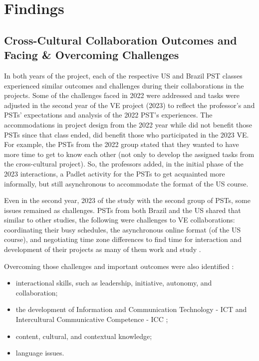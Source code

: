 \section{Findings}\label{sec-findings}
\subsection{Cross-Cultural Collaboration Outcomes and Facing \&	Overcoming Challenges}\label{sub-sec-crosscultural}
	
In both years of the project, each of the respective US and Brazil PST
classes experienced similar outcomes and challenges during their
collaborations in the projects. 
Some of the challenges faced in 2022 were addressed and tasks
were adjusted in the second year of the VE project (2023) to reflect the
professor’s and PSTs’ expectations and analysis of the 2022 PST's experiences. The accommodations in project design from the 2022 year while did not benefit those PSTs since that
class ended, did benefit those who participated in the 2023 VE. For
example, the PSTs from the 2022 group stated that they wanted to have
more time to get to know each other (not only to develop the assigned
tasks from the cross-cultural project). So, the professors added, in the
initial phase of the 2023 interactions, a Padlet activity for the PSTs
to get acquainted more informally, but still asynchronous to accommodate
the format of the US course.

Even in the second year, 2023 of the study with the second group of
PSTs, some issues remained as challenges. PSTs from both Brazil and the
US shared that similar to other studies, the following were challenges
to VE collaborations: coordinating their busy schedules, the
asynchronous online format (of the US course), and negotiating time zone
differences to find time for interaction and development of their
projects as many of them work and study \cite{fuchs2017multiple,evaluate2019evaluating,kern_learning_2018}.

Overcoming those challenges and important outcomes were also identified
:

\begin{itemize}
\item	interactional skills, such as leadership, initiative, autonomy, and collaboration;
\item	the development of Information and Communication Technology - ICT \cite{calvo2023investigating} and Intercultural Communicative Competence - ICC \cite{idris2019intercultural,lopez2017developing};
\item	content, cultural, and contextual knowledge;
\item	language issues.
\end{itemize}
	
